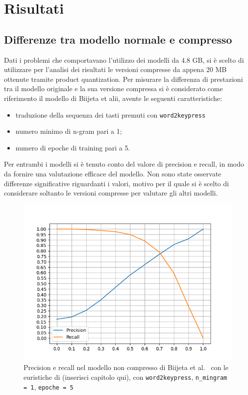 \chapter{Risultati}

\section{Differenze tra modello normale e compresso}
Dati i problemi che comportavano l'utilizzo dei modelli da 4.8 GB, si è scelto di utilizzare per l'analisi dei risultati le versioni compresse da appena 20 MB ottenute tramite product quantization.
Per misurare la differenza di prestazioni tra il modello originale e la sua versione compressa si è considerato come riferimento il modello di Biijeta et alii, avente le seguenti caratteristiche:
\begin{itemize}
    \item traduzione della sequenza dei tasti premuti con \texttt{word2keypress}
    \item numero minimo di n-gram pari a 1;
    \item numero di epoche di training pari a 5.
\end{itemize}
Per entrambi i modelli si è tenuto conto del valore di precision e recall, in modo da fornire una valutazione efficace del modello.
Non sono state osservate differenze significative riguardanti i valori, motivo per il quale si è scelto di considerare soltanto le versioni compresse per valutare gli altri modelli.

\begin{figure}[H]
    \centering
    \includegraphics[width=11.5cm]{./immagini/big_model.png}
    \caption{Precision e recall nel modello non compresso di Biijeta et al.~\cite{biijeta} con le euristiche di (inserisci capitolo qui), con \texttt{word2keypress}, \texttt{n\_mingram = 1}, \texttt{epoche = 5}}
    \label{bigmodel}
\end{figure}

